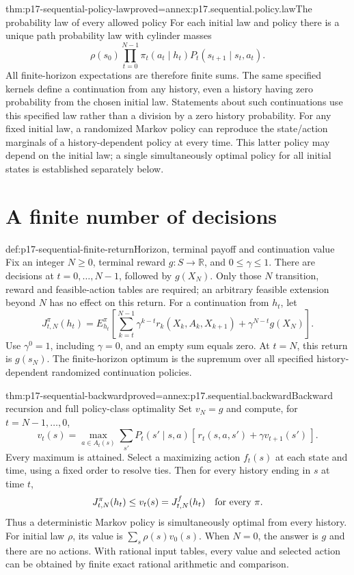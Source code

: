 \begin{hbtheorem}{thm:p17-sequential-policy-law}{proved=annex:p17.sequential.policy.law}{The probability law of every allowed policy}
For each initial law and policy there is a unique path probability
law with cylinder masses
\[
 \rho(s_0)\prod_{t=0}^{N-1}
          \pi_t(a_t\mid h_t)P_t(s_{t+1}\mid s_t,a_t).
\]
All finite-horizon expectations are therefore finite sums.
The same specified kernels define a continuation from any
history, even a history having zero probability from the chosen
initial law. Statements about such continuations use this
specified law rather than a division by a zero history probability.
For any fixed initial law, a randomized Markov policy can reproduce
the state/action marginals of a history-dependent policy at every
time. This latter policy may depend on the initial law; a single
simultaneously optimal policy for all initial states is established
separately below.
\end{hbtheorem}

\section{A finite number of decisions}

\begin{hbdefinition}{def:p17-sequential-finite-return}{Horizon, terminal payoff and continuation value}
Fix an integer \(N\geq0\), terminal reward \(g:S\to\mathbb R\),
and \(0\leq\gamma\leq1\). There are decisions at
\(t=0,\ldots,N-1\), followed by \(g(X_N)\).
Only those \(N\) transition, reward and feasible-action tables
are required; an arbitrary feasible extension beyond \(N\)
has no effect on this return.
For a continuation from \(h_t\), let
\[
 J_{t,N}^{\pi}(h_t)=
 E_{h_t}^{\pi}\!\left[
   \sum_{k=t}^{N-1}\gamma^{k-t}
           r_k(X_k,A_k,X_{k+1})+\gamma^{N-t}g(X_N)\right].
\]
Use \(\gamma^0=1\), including \(\gamma=0\), and an empty sum
equals zero. At \(t=N\), this return is \(g(s_N)\).
The finite-horizon optimum is the supremum over all specified
history-dependent randomized continuation policies.
\end{hbdefinition}

\begin{hbtheorem}{thm:p17-sequential-backward}{proved=annex:p17.sequential.backward}{Backward recursion and full policy-class optimality}
Set \(v_N=g\) and compute, for \(t=N-1,\ldots,0\),
\[
 v_t(s)=\max_{a\in A_t(s)}
       \sum_{s'}P_t(s'\mid s,a)
                       [\,r_t(s,a,s')+\gamma v_{t+1}(s')\,].
\]
Every maximum is attained. Select a maximizing action
\(f_t(s)\) at each state and time, using a fixed order to resolve
ties. Then for every history ending in \(s\) at time \(t\),
\[
                 J_{t,N}^{\pi}(h_t)\leq v_t(s)
                         =J_{t,N}^{f}(h_t)
                    \quad\hbox{for every }\pi.
\]
Thus a deterministic Markov policy is simultaneously optimal
from every history. For initial law \(\rho\), its value is
\(\sum_s\rho(s)v_0(s)\).
When \(N=0\), the answer is \(g\) and there are no actions.
With rational input tables, every value and selected action can
be obtained by finite exact rational arithmetic and comparison.
\end{hbtheorem}

